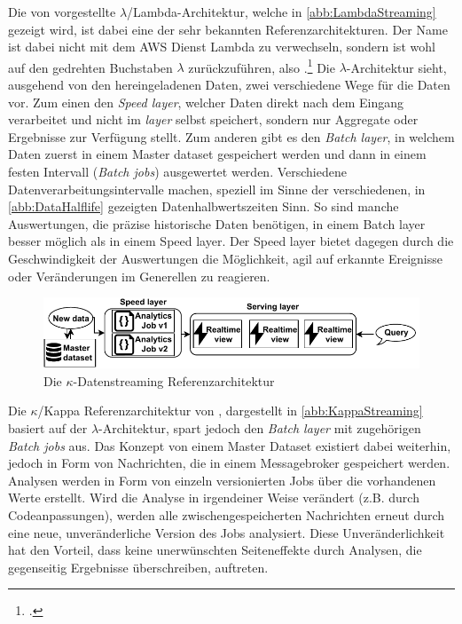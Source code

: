 Die von \citeauthor{Marz.2015} vorgestellte $\lambda$/Lambda-Architektur, welche in \autoref{abb:LambdaStreaming} gezeigt wird, ist dabei eine der sehr bekannten Referenzarchitekturen. 
Der Name ist dabei nicht mit dem \ac{AWS} Dienst Lambda zu verwechseln, sondern ist wohl auf den gedrehten Buchstaben $\lambda$ zurückzuführen, also .\footcite[Vgl. auch im Folgenden][]{Berle.27.11.2017} Die $\lambda$-Architektur sieht, ausgehend von den hereingeladenen Daten, zwei verschiedene Wege für die Daten vor. 
Zum einen den \textit{Speed layer}, welcher Daten direkt nach dem Eingang verarbeitet und nicht im \textit{layer} selbst speichert, sondern nur Aggregate oder Ergebnisse zur Verfügung stellt. Zum anderen gibt es den \textit{Batch layer}, in welchem Daten zuerst in einem Master dataset gespeichert werden und dann in einem festen Intervall (\textit{Batch jobs}) ausgewertet werden. 
Verschiedene Datenverarbeitungsintervalle machen, speziell im Sinne der verschiedenen, in \autoref{abb:DataHalflife} gezeigten Datenhalbwertszeiten Sinn. So sind manche Auswertungen, die präzise historische Daten benötigen, in einem Batch layer besser möglich als in einem Speed layer. Der Speed layer bietet dagegen durch die Geschwindigkeit der Auswertungen die Möglichkeit, agil auf erkannte Ereignisse oder Veränderungen im Generellen zu reagieren.

\begin{figure}[H]
\centering
\includegraphics[width=\textwidth]{graphics/Kappa-Reference-Architecture.pdf}
\caption[Die $\kappa$-Datenstreaming Referenzarchitetktur]{Die $\kappa$-Datenstreaming Referenzarchitektur\footnotemark}
\label{abb:KappaStreaming}
\end{figure}

Die $\kappa$/Kappa Referenzarchitektur von \citeauthor{Kreps.2014}, dargestellt in \autoref{abb:KappaStreaming} basiert auf der $\lambda$-Architektur, spart jedoch den \textit{Batch layer} mit zugehörigen \textit{Batch jobs} aus. 
Das Konzept von einem Master Dataset existiert dabei weiterhin, jedoch in Form von Nachrichten, die in einem Messagebroker gespeichert werden. Analysen werden in Form von einzeln versionierten Jobs über die vorhandenen Werte erstellt. 
Wird die Analyse in irgendeiner Weise verändert (z.B. durch Codeanpassungen), werden alle zwischengespeicherten Nachrichten erneut durch eine neue, unveränderliche Version des Jobs analysiert. Diese Unveränderlichkeit hat den Vorteil, dass keine unerwünschten Seiteneffekte durch Analysen, die gegenseitig Ergebnisse überschreiben, auftreten. 



